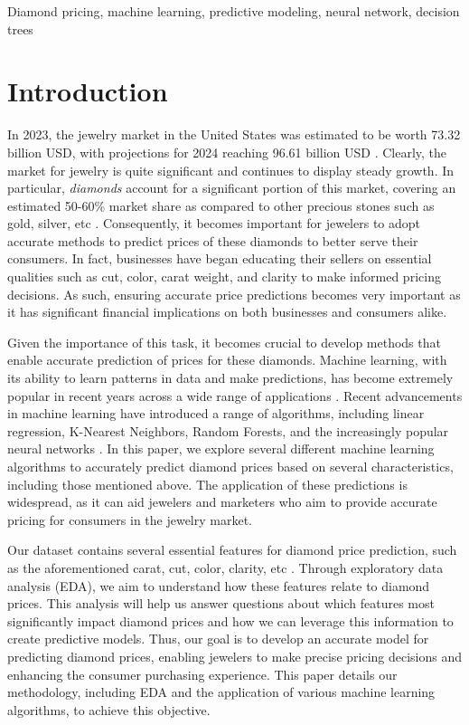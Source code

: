 \documentclass[conference]{IEEEtran}
\begin{document}
\begin{IEEEkeywords}
Diamond pricing, machine learning, predictive modeling, neural network, decision trees
\end{IEEEkeywords}

\section{Introduction}

In 2023, the jewelry market in the United States was estimated to be worth 73.32 billion USD, with projections for 2024 reaching 96.61 billion USD \cite{a3}. Clearly, the market for jewelry is quite significant and continues to display steady growth. In particular, \emph{diamonds} account for a significant portion of this market, covering an estimated 50-60\% market share as compared to other precious stones such as gold, silver, etc \cite{a4}. Consequently, it becomes important for jewelers to adopt accurate methods to predict prices of these diamonds to better serve their consumers. In fact, businesses have began educating their sellers on essential qualities such as cut, color, carat weight, and clarity to make informed pricing decisions. As such, ensuring accurate price predictions becomes very important as it has significant financial implications on both businesses and consumers alike.

Given the importance of this task, it becomes crucial to develop methods that enable accurate prediction of prices for these diamonds. Machine learning, with its ability to learn patterns in data and make predictions, has become extremely popular in recent years across a wide range of applications \cite{a1}. Recent advancements in machine learning have introduced a range of algorithms, including linear regression, K-Nearest Neighbors, Random Forests, and the increasingly popular neural networks \cite{c1}. In this paper, we explore several different machine learning algorithms to accurately predict diamond prices based on several characteristics, including those mentioned above. The application of these predictions is widespread, as it can aid jewelers and marketers who aim to provide accurate pricing for consumers in the jewelry market.

Our dataset contains several essential features for diamond price prediction, such as the aforementioned carat, cut, color, clarity, etc \cite{a2}. Through exploratory data analysis (EDA), we aim to understand how these features relate to diamond prices. This analysis will help us answer questions about which features most significantly impact diamond prices and how we can leverage this information to create predictive models. Thus, our goal is to develop an accurate model for predicting diamond prices, enabling jewelers to make precise pricing decisions and enhancing the consumer purchasing experience. This paper details our methodology, including EDA and the application of various machine learning algorithms, to achieve this objective.
\end{document}
